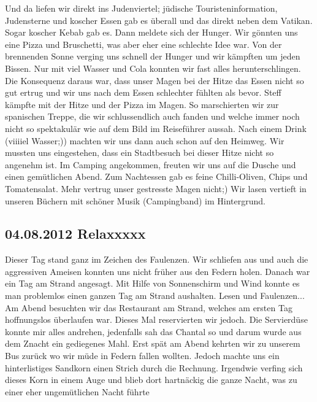 Und da liefen wir direkt ins Judenviertel; jüdische Touristeninformation, Judensterne und koscher Essen gab es überall und das direkt neben dem Vatikan.
Sogar koscher Kebab gab es.
Dann meldete sich der Hunger.
Wir gönnten uns eine Pizza und Bruschetti, was aber eher eine schlechte Idee war.
Von der brennenden Sonne verging uns schnell der Hunger und wir kämpften um jeden Bissen.
Nur mit viel Wasser und Cola konnten wir fast alles herunterschlingen.
Die Konsequenz daraus war, dass unser Magen bei der Hitze das Essen nicht so gut ertrug und wir uns nach dem Essen schlechter fühlten als bevor.
Steff kämpfte mit der Hitze und der Pizza im Magen.
So marschierten wir zur spanischen Treppe, die wir schlussendlich auch fanden und welche immer noch nicht so spektakulär wie auf dem Bild im Reiseführer aussah.
Nach einem Drink (viiiiel Wasser;)) machten wir uns dann auch schon auf den Heimweg.
Wir mussten uns eingestehen, dass ein Stadtbesuch bei dieser Hitze nicht so angenehm ist.
Im Camping angekommen, freuten wir uns auf die Dusche und einen gemütlichen Abend.
Zum Nachtessen gab es feine Chilli-Oliven, Chips und Tomatensalat.
Mehr vertrug unser gestresste Magen nicht;) Wir lasen vertieft in unseren Büchern mit schöner Musik (Campingband) im Hintergrund.

\subsection{04.08.2012 Relaxxxxx}
Dieser Tag stand ganz im Zeichen des Faulenzen.
Wir schliefen aus und auch die aggressiven Ameisen konnten uns nicht früher aus den Federn holen.
Danach war ein Tag am Strand angesagt.
Mit Hilfe von Sonnenschirm und Wind konnte es man problemlos einen ganzen Tag am Strand aushalten.
Lesen und Faulenzen...
Am Abend besuchten wir das Restaurant am Strand, welches am ersten Tag hoffnungslos überlaufen war.
Dieses Mal reservierten wir jedoch.
Die Servierdüse konnte mir alles andrehen, jedenfalls sah das Chantal so und darum wurde aus dem Znacht ein gediegenes Mahl.
Erst spät am Abend kehrten wir zu unserem Bus zurück wo wir müde in Federn fallen wollten.
Jedoch machte uns ein hinterlistiges Sandkorn einen Strich durch die Rechnung.
Irgendwie verfing sich dieses Korn in einem Auge und blieb dort hartnäckig die ganze Nacht, was zu einer eher ungemütlichen Nacht führte

